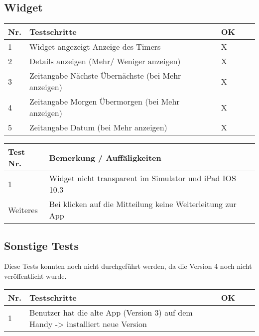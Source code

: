 \subsection{Widget}
\noindent%
\begin{tabularx}{\textwidth}{|p{}|p{}|X|X|X| }
\hline
\textbf{Nr.} &\textbf{Testschritte} &\textbf{OK}   \\ \hline 
1 & Widget angezeigt Anzeige des Timers & X     \\ \hline
2 & Details anzeigen (Mehr/ Weniger anzeigen) & X    \\ \hline
3 & Zeitangabe Nächste Übernächste (bei Mehr anzeigen) & X   \\ \hline
4 & Zeitangabe Morgen Übermorgen (bei Mehr anzeigen) & X  \\ \hline
5 & Zeitangabe Datum (bei Mehr anzeigen) & X  \\ \hline
\end{tabularx}
\newline
\newline

\noindent%
\begin{tabularx}{\textwidth}{|p{}|X|X| }
\hline
\textbf{Test Nr.} &\textbf{Bemerkung / Auffäligkeiten}   \\ \hline 
 1 & 
Widget nicht transparent im Simulator und iPad IOS 10.3  \\ \hline
Weiteres & 
Bei klicken auf die Mitteilung keine Weiterleitung zur App  \\ \hline
\end{tabularx}
\newline
\newline

\subsection{Sonstige Tests}
Diese Tests konnten noch nicht durchgeführt werden, da die Version 4 noch nicht veröffentlicht wurde. \newline\newline
\noindent%
\begin{tabularx}{\textwidth}{|p{}|p{}|X|X|X| }
\hline
\textbf{Nr.} &\textbf{Testschritte} &\textbf{OK}   \\ \hline 

1 & Benutzer hat die alte App (Version 3) auf dem Handy -> installiert neue Version &      \\ \hline

\end{tabularx}
\newline
\newline


